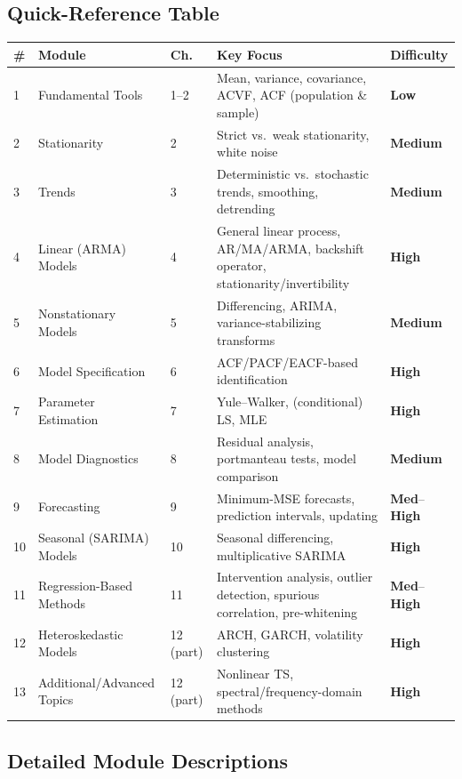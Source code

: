 \documentclass[11pt]{article}
\newcommand{\Low}{\textcolor{diffLow}{\textbf{Low}}}
\newcommand{\Med}{\textcolor{diffMed}{\textbf{Medium}}}
\newcommand{\High}{\textcolor{diffHigh}{\textbf{High}}}
\newcommand{\MedHigh}{\textcolor{diffMed}{\textbf{Med}}--\textcolor{diffHigh}{\textbf{High}}}
\begin{document}
\subsection*{Quick-Reference Table}
\renewcommand{\arraystretch}{1.3}
\begin{longtable}{p{0.5cm} p{4.3cm} p{1.0cm} p{6.2cm} p{1.6cm}}
\toprule
\textbf{\#} & \textbf{Module} & \textbf{Ch.} & \textbf{Key Focus} & \textbf{Difficulty} \\
\midrule
\endhead
1 & Fundamental Tools & 1--2 & Mean, variance, covariance, ACVF, ACF (population \& sample) & \Low \\
2 & Stationarity & 2 & Strict vs.\ weak stationarity, white noise & \Med \\
3 & Trends & 3 & Deterministic vs.\ stochastic trends, smoothing, detrending & \Med \\
4 & Linear (ARMA) Models & 4 & General linear process, AR/MA/ARMA, backshift operator, stationarity/invertibility & \High \\
5 & Nonstationary Models & 5 & Differencing, ARIMA, variance-stabilizing transforms & \Med \\
6 & Model Specification & 6 & ACF/PACF/EACF-based identification & \High \\
7 & Parameter Estimation & 7 & Yule--Walker, (conditional) LS, MLE & \High \\
8 & Model Diagnostics & 8 & Residual analysis, portmanteau tests, model comparison & \Med \\
9 & Forecasting & 9 & Minimum-MSE forecasts, prediction intervals, updating & \MedHigh \\
10 & Seasonal (SARIMA) Models & 10 & Seasonal differencing, multiplicative SARIMA & \High \\
11 & Regression-Based Methods & 11 & Intervention analysis, outlier detection, spurious correlation, pre-whitening & \MedHigh \\
12 & Heteroskedastic Models & 12 (part) & ARCH, GARCH, volatility clustering & \High \\
13 & Additional/Advanced Topics & 12 (part) & Nonlinear TS, spectral/frequency-domain methods & \High \\
\bottomrule
\end{longtable}

\subsection*{Detailed Module Descriptions}
\end{document}
